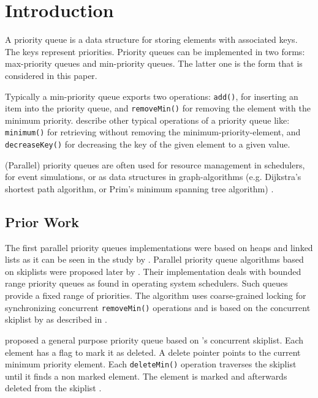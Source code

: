 
\section{Introduction}

A priority queue is a data structure for storing elements with associated keys. The keys represent priorities. Priority queues can be implemented in two forms: max-priority queues and min-priority queues. The latter one is the form that is considered in this paper.

Typically a min-priority queue exports two operations: \texttt{add()}, for inserting an item into the priority queue, and \texttt{removeMin()} for removing the element with the minimum priority. \citeauthor{cormen_introduction_2009} describe other typical operations of a priority queue like: \texttt{minimum()} for retrieving without removing the minimum-priority-element, and \texttt{decreaseKey()} for decreasing the key of the given element to a given value.

(Parallel) priority queues are often used for resource management in schedulers, for event simulations, or as data structures in graph-algorithms (e.g. Dijkstra's shortest path algorithm, or Prim's minimum spanning tree algorithm) \cite{cormen_introduction_2009}.

\subsection{Prior Work}

The first parallel priority queues implementations were based on heaps and linked lists as it can be seen in the study by \citeauthor{ronngren_comparative_1997} \cite{ronngren_comparative_1997}. Parallel priority queue algorithms based on skiplists were proposed later by \citeauthor{shavit_scalable_1999}. Their implementation deals with bounded range priority queues as found in operating system schedulers. Such queues provide a fixed range of priorities. The algorithm uses coarse-grained locking for synchronizing concurrent \texttt{removeMin()} operations and is based on the concurrent skiplist by \citeauthor{pugh_concurrent_1990} as described in \cite{pugh_concurrent_1990} \cite{shavit_scalable_1999}.

\citeauthor{lotan_skiplist-based_2000} proposed a general purpose priority queue based on \citeauthor{pugh_concurrent_1990}'s concurrent skiplist. Each element has a flag to mark it as deleted. A delete pointer points to the current minimum priority element. Each \texttt{deleteMin()} operation traverses the skiplist until it finds a non marked element. The element is marked and afterwards deleted from the skiplist \cite{lotan_skiplist-based_2000}.

